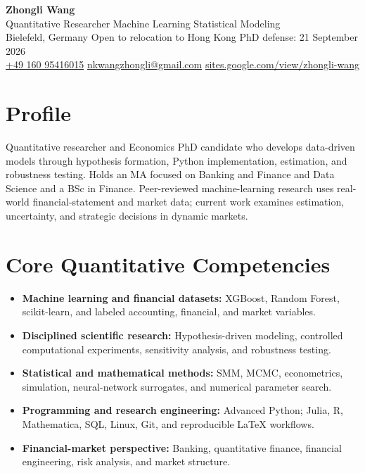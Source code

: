\documentclass[a4paper,11pt]{article}
\begin{document}
\begin{center}
  {\LARGE\textbf{\textcolor{accent}{Zhongli Wang}}}\\[3pt]
  {\large Quantitative Researcher \textbar{} Machine Learning \textbar{} Statistical Modeling}\\[3pt]
  Bielefeld, Germany \textbar{} Open to relocation to Hong Kong \textbar{} PhD defense: 21 September 2026\\[2pt]
  \href{tel:+4916095416015}{+49 160 95416015} \textbar{}
  \href{mailto:nkwangzhongli@gmail.com}{nkwangzhongli@gmail.com} \textbar{}
  \href{https://sites.google.com/view/zhongli-wang/}{sites.google.com/view/zhongli-wang}
\end{center}

\section{Profile}
Quantitative researcher and Economics PhD candidate who develops data-driven models through hypothesis formation, Python implementation, estimation, and robustness testing. Holds an MA focused on Banking and Finance and Data Science and a BSc in Finance. Peer-reviewed machine-learning research uses real-world financial-statement and market data; current work examines estimation, uncertainty, and strategic decisions in dynamic markets.

\section{Core Quantitative Competencies}
\begin{itemize}
  \item \textbf{Machine learning and financial datasets:} XGBoost, Random Forest, scikit-learn, and labeled accounting, financial, and market variables.
  \item \textbf{Disciplined scientific research:} Hypothesis-driven modeling, controlled computational experiments, sensitivity analysis, and robustness testing.
  \item \textbf{Statistical and mathematical methods:} SMM, MCMC, econometrics, simulation, neural-network surrogates, and numerical parameter search.
  \item \textbf{Programming and research engineering:} Advanced Python; Julia, R, Mathematica, SQL, Linux, Git, and reproducible LaTeX workflows.
  \item \textbf{Financial-market perspective:} Banking, quantitative finance, financial engineering, risk analysis, and market structure.
\end{itemize}
\end{document}
